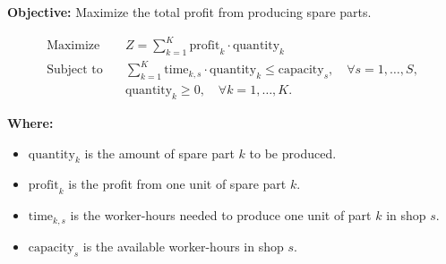 \documentclass{article}
\begin{document}
\textbf{Objective:} Maximize the total profit from producing spare parts.

\[
\begin{align*}
\text{Maximize} \quad & Z = \sum_{k=1}^{K} \text{profit}_k \cdot \text{quantity}_k \\
\text{Subject to} \quad & \sum_{k=1}^{K} \text{time}_{k,s} \cdot \text{quantity}_k \leq \text{capacity}_s, \quad \forall s = 1, \ldots, S, \\
& \text{quantity}_k \geq 0, \quad \forall k = 1, \ldots, K.
\end{align*}
\]

\textbf{Where:}
\begin{itemize}
    \item \( \text{quantity}_k \) is the amount of spare part \( k \) to be produced.
    \item \( \text{profit}_k \) is the profit from one unit of spare part \( k \).
    \item \( \text{time}_{k,s} \) is the worker-hours needed to produce one unit of part \( k \) in shop \( s \).
    \item \( \text{capacity}_s \) is the available worker-hours in shop \( s \).
\end{itemize}
\end{document}
